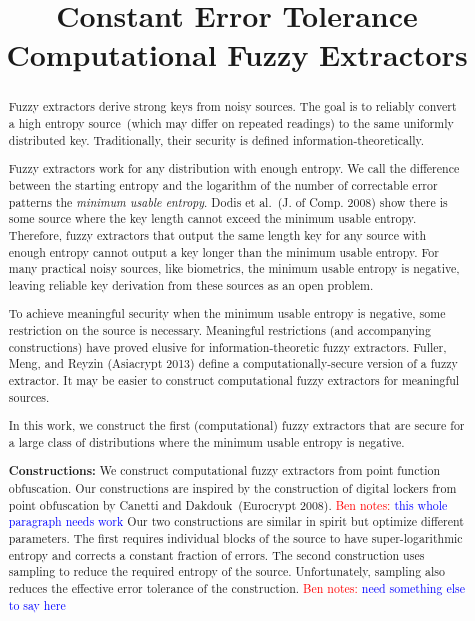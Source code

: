 \documentclass[11pt]{article}
\title{Constant Error Tolerance Computational Fuzzy Extractors}
\newcommand{\authnote}[2]{{\textcolor{red}{\textsf{#1 notes: }\textcolor{blue}{ #2}}\marginpar{\textcolor{red}{\textbf{!!!!!}}}}}
\newcommand{\authnote}[2]{}
\newcommand{\bnote}[1]{{\authnote{Ben}{#1}}}
\begin{document}
\maketitle


\begin{abstract}
Fuzzy extractors derive strong keys from noisy sources.  The goal is to reliably convert a high entropy source~(which may differ on repeated readings) to the same uniformly distributed key.  Traditionally, their security is defined information-theoretically.  %

Fuzzy extractors work for any distribution with enough entropy.  %
We call the difference between the starting entropy and the logarithm of the number of correctable error patterns the \emph{minimum usable entropy}.  Dodis et al.~(J. of Comp. 2008) show there is some source where the key length cannot exceed the minimum usable entropy.  Therefore, fuzzy extractors that output the same length key for any source with enough entropy cannot output a key longer than the minimum usable entropy.
For many practical noisy sources, like biometrics, the minimum usable entropy is negative, leaving reliable key derivation from these sources as an open problem.

To achieve meaningful security when the minimum usable entropy is negative, some restriction on the source is necessary.  Meaningful restrictions (and accompanying constructions) have proved elusive for information-theoretic fuzzy extractors.
Fuller, Meng, and Reyzin (Asiacrypt 2013) define a computationally-secure version of a fuzzy extractor.  It may be easier to construct computational fuzzy extractors for meaningful sources.

In this work, we construct the first (computational) fuzzy extractors that are secure for a large class of distributions where the minimum usable entropy is negative.

\textbf{Constructions:}  We construct computational fuzzy extractors from point function obfuscation.
Our constructions are inspired by the construction of digital lockers from point obfuscation by Canetti and Dakdouk~(Eurocrypt 2008).  
\bnote{this whole paragraph needs work} Our two constructions are similar in spirit but optimize different parameters.  The first requires individual blocks of the source to have super-logarithmic entropy and corrects a constant fraction of errors.  The second construction uses sampling to reduce the required entropy of the source.  Unfortunately, sampling also reduces the effective error tolerance of the construction.  %
\bnote{need something else to say here}
\end{abstract}
\end{document}
